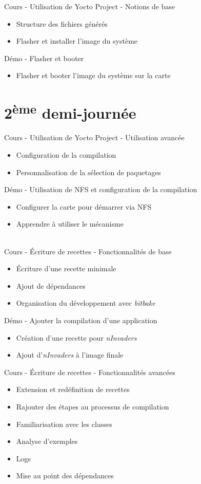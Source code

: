 \documentclass[a4paper,12pt,obeyspaces,spaces,hyphens]{article}
\begin{document}
\newpage
\feagendatwocolumn
{Cours - Utilisation de Yocto Project - Notions de base}
{
  \begin{itemize}
  \item Structure des fichiers générés
  \item Flasher et installer l'image du système
  \end{itemize}
}
{Démo - Flasher et booter}
{
  \begin{itemize}
  \item Flasher et booter l'image du système sur la carte
  \end{itemize}
}

\section{2\textsuperscript{ème} demi-journée}

\feagendatwocolumn
{Cours - Utilisation de Yocto Project - Utilisation avancée}
{
  \begin{itemize}
  \item Configuration de la compilation
  \item Personnalisation de la sélection de paquetages
  \end{itemize}
}
{Démo - Utilisation de NFS et configuration de la compilation}
{
  \begin{itemize}
  \item Configurer la carte pour démarrer via NFS
  \item Apprendre à utiliser le mécanisme 
  \end{itemize}
}
\\

\feagendatwocolumn
{Cours - Écriture de recettes - Fonctionnalités de base}
{
  \begin{itemize}
  \item Écriture d'une recette minimale
  \item Ajout de dépendances
  \item Organisation du développement avec {\em bitbake}
  \end{itemize}
}
{Démo - Ajouter la compilation d'une application}
{
  \begin{itemize}
  \item Création d'une recette pour {\em nInvaders}
  \item Ajout d'{\em nInvaders} à l'image finale
  \end{itemize}
}

\feagendaonecolumn
{Cours - Écriture de recettes - Fonctionnalités avancées}
{
  \begin{itemize}
  \item Extension et redéfinition de recettes
  \item Rajouter des étapes au processus de compilation
  \item Familiarisation avec les classes
  \item Analyse d'exemples
  \item Logs
  \item Mise au point des dépendances
  \end{itemize}
}
\end{document}
